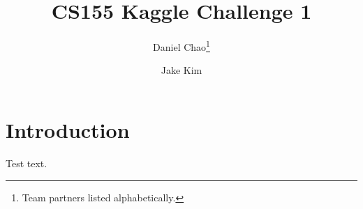 \documentclass{article}
\title{CS155 Kaggle Challenge 1}
\author{Daniel Chao\thanks{Team partners listed alphabetically.} \and Jake Kim\footnotemark[1]}
\date{ }
\renewcommand{\(}{\left(}
\renewcommand{\)}{\right)}
\begin{document}
\maketitle 
\tableofcontents 

\section{Introduction}
Test text. 
\end{document}
